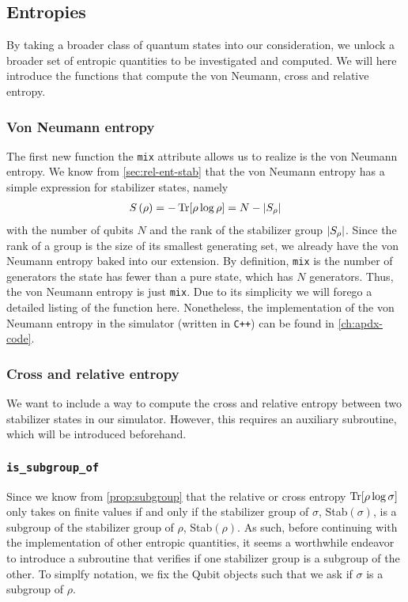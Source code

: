 \subsection{Entropies}
By taking a broader class of quantum states into our consideration, we unlock a
broader set of entropic quantities to be investigated and computed. We will
here introduce the functions that compute the von Neumann, cross and relative
entropy.
\subsubsection{Von Neumann entropy}
The first new function the \verb|mix| attribute allows us to realize is the von
Neumann entropy. We know from \cref{sec:rel-ent-stab} that the von Neumann
entropy has a simple expression for stabilizer states, namely
\begin{align}
  S\left( \rho \right) = -\Tr[\rho\log\rho] = N - \abs{S_\rho}
\end{align}
with the number of qubits $N$ and the rank of the stabilizer group
$\abs{S_\rho}$. Since the rank of a group is the size of its smallest
generating set, we already have the von Neumann entropy baked into our
extension. By definition, \verb|mix| is the number of generators the state has
fewer than a pure state, which has $N$ generators. Thus, the von Neumann
entropy is just \verb|mix|. Due to its simplicity we will forego a detailed
listing of the function here. Nonetheless, the implementation of the von
Neumann entropy in the simulator (written in \verb|C++|) can be found in
\cref{ch:apdx-code}.

\subsubsection{Cross and relative entropy}
We want to include a way to compute the cross and relative entropy between two
stabilizer states in our simulator. However, this requires an auxiliary
subroutine, which will be introduced beforehand.

\subsubsection{\texttt{is\_subgroup\_of}}
Since we know from \cref{prop:subgroup} that the relative or cross
entropy $\Tr[\rho\log\sigma]$ only takes on finite values if and only if the
stabilizer group of $\sigma$, Stab$(\sigma)$, is a subgroup of the stabilizer group
of $\rho$, Stab$(\rho)$. As such, before continuing with the implementation of
other entropic quantities, it seems a worthwhile endeavor to introduce a
subroutine that verifies if one stabilizer group is a subgroup of the other.
To simplfy notation, we fix the Qubit objects such that we ask if $\sigma$ is a
subgroup of $\rho$.

